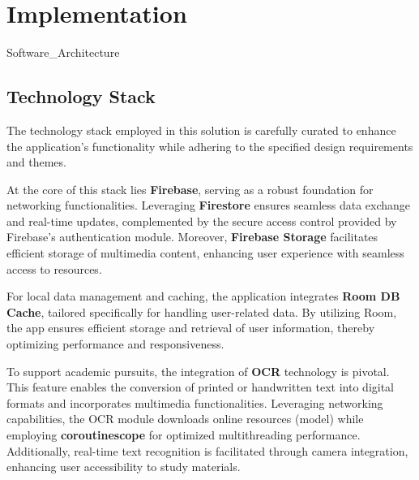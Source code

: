 
\chapter{Implementation}\label{implementation}

{Software_Architecture}

\section{Technology Stack}

The technology stack employed in this solution is carefully curated to enhance the application's functionality while adhering to the specified design requirements and themes.

At the core of this stack lies \textbf{Firebase}, serving as a robust foundation for networking functionalities. Leveraging \textbf{Firestore} ensures seamless data exchange and real-time updates, complemented by the secure access control provided by Firebase's authentication module. Moreover, \textbf{Firebase Storage} facilitates efficient storage of multimedia content, enhancing user experience with seamless access to resources.

For local data management and caching, the application integrates \textbf{Room DB Cache}, tailored specifically for handling user-related data. By utilizing Room, the app ensures efficient storage and retrieval of user information, thereby optimizing performance and responsiveness.

To support academic pursuits, the integration of \textbf{OCR} technology is pivotal. This feature enables the conversion of printed or handwritten text into digital formats and incorporates multimedia functionalities. Leveraging networking capabilities, the OCR module downloads online resources (model) while employing \textbf{coroutinescope} for optimized multithreading performance. Additionally, real-time text recognition is facilitated through camera integration, enhancing user accessibility to study materials.

